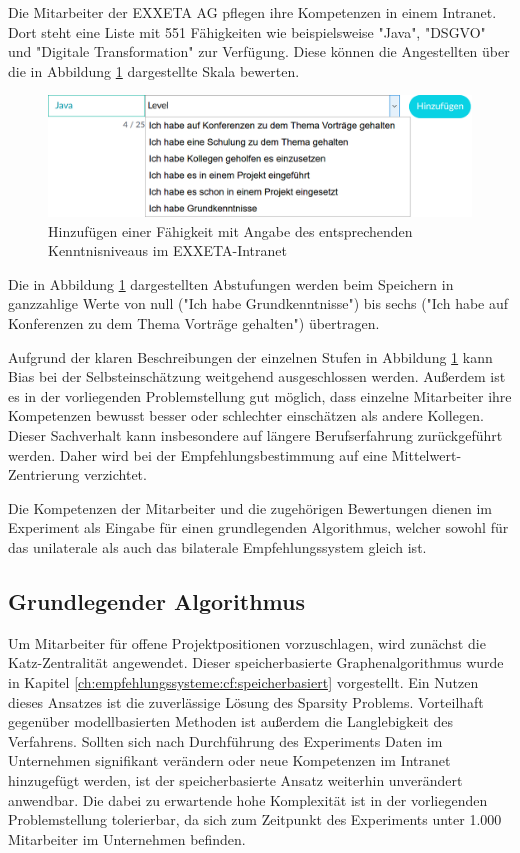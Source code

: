 Die Mitarbeiter der EXXETA AG pflegen ihre Kompetenzen in einem Intranet. Dort steht eine Liste mit 551 Fähigkeiten wie beispielsweise "Java", "DSGVO" und "Digitale Transformation" zur Verfügung. Diese können die Angestellten über die in Abbildung \ref{fig:methodik:versuchsaufbau:daten:abb1} dargestellte Skala bewerten.

\begin{figure}[h]
	\centering
	\includegraphics[width=1\textwidth]{gfx/skill-level.png}
	\caption{Hinzufügen einer Fähigkeit mit Angabe des entsprechenden Kenntnisniveaus im EXXETA-Intranet}
	\label{fig:methodik:versuchsaufbau:daten:abb1}
\end{figure}

Die in Abbildung \ref{fig:methodik:versuchsaufbau:daten:abb1} dargestellten Abstufungen werden beim Speichern in ganzzahlige Werte von null ("Ich habe Grundkenntnisse") bis sechs ("Ich habe auf Konferenzen zu dem Thema Vorträge gehalten") übertragen.

Aufgrund der klaren Beschreibungen der einzelnen Stufen in Abbildung \ref{fig:methodik:versuchsaufbau:daten:abb1} kann Bias bei der Selbsteinschätzung weitgehend ausgeschlossen werden. Außerdem ist es in der vorliegenden Problemstellung gut möglich, dass einzelne Mitarbeiter ihre Kompetenzen bewusst besser oder schlechter einschätzen als andere Kollegen. Dieser Sachverhalt kann insbesondere auf längere Berufserfahrung zurückgeführt werden. Daher wird bei der Empfehlungsbestimmung auf eine Mittelwert-Zentrierung verzichtet.

Die Kompetenzen der Mitarbeiter und die zugehörigen Bewertungen dienen im Experiment als Eingabe für einen grundlegenden Algorithmus, welcher sowohl für das unilaterale als auch das bilaterale Empfehlungssystem gleich ist.

\subsection{Grundlegender Algorithmus}
\label{ch:methodik:versuchsaufbau:grundlegend}
Um Mitarbeiter für offene Projektpositionen vorzuschlagen, wird zunächst die Katz-Zentralität angewendet. Dieser speicherbasierte Graphenalgorithmus wurde in Kapitel \ref{ch:empfehlungssysteme:cf:speicherbasiert} vorgestellt. Ein Nutzen dieses Ansatzes ist die zuverlässige Lösung des Sparsity Problems. Vorteilhaft gegenüber modellbasierten Methoden ist außerdem die Langlebigkeit des Verfahrens. Sollten sich nach Durchführung des Experiments Daten im Unternehmen signifikant verändern oder neue Kompetenzen im Intranet hinzugefügt werden, ist der speicherbasierte Ansatz weiterhin unverändert anwendbar. Die dabei zu erwartende hohe Komplexität ist in der vorliegenden Problemstellung tolerierbar, da sich zum Zeitpunkt des Experiments unter 1.000 Mitarbeiter im Unternehmen befinden.

